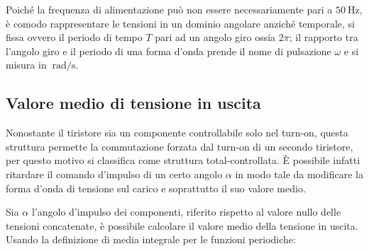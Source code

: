 \documentclass[a4paper,11pt]{article}
\begin{document}
Poiché la frequenza di alimentazione può non essere necessariamente pari a 
$\SI{50}{\hertz}$, è comodo rappresentare le tensioni in un dominio angolare anziché 
temporale, si fissa ovvero il periodo di tempo \(T\) pari ad un angolo giro ossia 
\(2\pi\); il rapporto tra l'angolo giro e il periodo di una forma d'onda prende il
nome di pulsazione \(\omega\) e si misura in $\SI{}{\radian\per\second}$.

\subsection{Valore medio di tensione in uscita}
Nonostante il tiristore sia un componente controllabile solo nel turn-on, questa 
struttura permette la commutazione forzata dal turn-on di un secondo tiristore,
per questo motivo si classifica come struttura total-controllata.
È possibile infatti ritardare il comando d'impulso di un certo angolo \(\alpha\) in
modo tale da modificare la forma d'onda di tensione sul carico e soprattutto il suo valore medio.

Sia \(\alpha\) l'angolo d'impulso dei componenti, riferito rispetto al valore nullo
delle tensioni concatenate, è possibile calcolare il valore medio della tensione in uscita.
Usando la definizione di media integrale per le funzioni periodiche:
\end{document}
